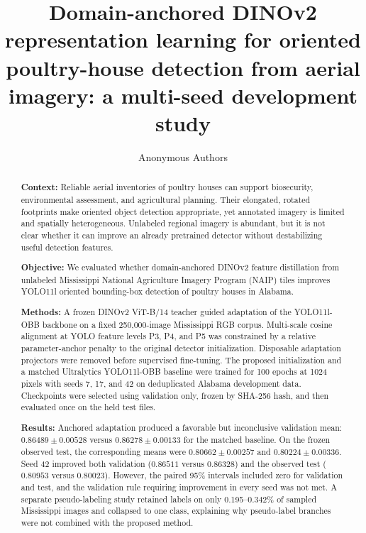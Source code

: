 \documentclass[preprint,12pt,authoryear]{elsarticle}
\begin{document}
\begin{frontmatter}

\title{Domain-anchored DINOv2 representation learning for oriented poultry-house detection from aerial imagery: a multi-seed development study}

\author[blind]{Anonymous Authors}

\begin{abstract}
\textbf{Context:} Reliable aerial inventories of poultry houses can support biosecurity, environmental assessment, and agricultural planning. Their elongated, rotated footprints make oriented object detection appropriate, yet annotated imagery is limited and spatially heterogeneous. Unlabeled regional imagery is abundant, but it is not clear whether it can improve an already pretrained detector without destabilizing useful detection features.

\textbf{Objective:} We evaluated whether domain-anchored DINOv2 feature distillation from unlabeled Mississippi National Agriculture Imagery Program (NAIP) tiles improves YOLO11l oriented bounding-box detection of poultry houses in Alabama.

\textbf{Methods:} A frozen DINOv2 ViT-B/14 teacher guided adaptation of the YOLO11l-OBB backbone on a fixed 250,000-image Mississippi RGB corpus. Multi-scale cosine alignment at YOLO feature levels P3, P4, and P5 was constrained by a relative parameter-anchor penalty to the original detector initialization. Disposable adaptation projectors were removed before supervised fine-tuning. The proposed initialization and a matched Ultralytics YOLO11l-OBB baseline were trained for 100 epochs at 1024 pixels with seeds 7, 17, and 42 on deduplicated Alabama development data. Checkpoints were selected using validation only, frozen by SHA-256 hash, and then evaluated once on the held test files.

\textbf{Results:} Anchored adaptation produced a favorable but inconclusive validation mean: $0.86489 \pm 0.00528$ versus $0.86278 \pm 0.00133$ for the matched baseline. On the frozen observed test, the corresponding means were $0.80662 \pm 0.00257$ and $0.80224 \pm 0.00336$. Seed 42 improved both validation ($0.86511$ versus $0.86328$) and the observed test ($0.80953$ versus $0.80023$). However, the paired 95\% intervals included zero for validation and test, and the validation rule requiring improvement in every seed was not met. A separate pseudo-labeling study retained labels on only 0.195--0.342\% of sampled Mississippi images and collapsed to one class, explaining why pseudo-label branches were not combined with the proposed method.


\end{abstract}
\end{frontmatter}
\end{document}
